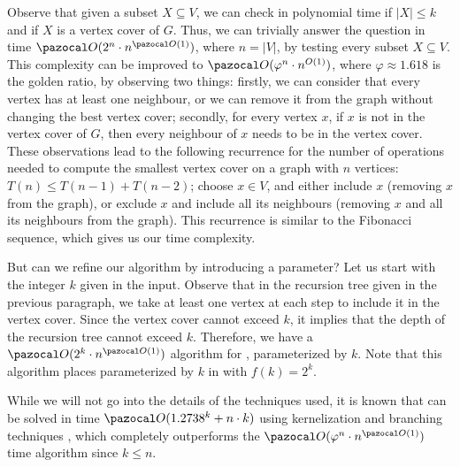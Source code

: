 Observe that given a subset $X \subseteq V$, we can check in polynomial time if $|X| \leq k$ and if $X$ is a vertex cover of $G$. Thus, we can trivially answer the question in time $\O(2^n \cdot n^{\O(1)})$, where $n = |V|$, by testing every subset $X \subseteq V$. This complexity can be improved to $\O(\varphi^n \cdot n^{O(1)})$, where $\varphi \approx 1.618$ is the golden ratio, by observing two things: firstly, we can consider that every vertex has at least one neighbour, or we can remove it from the graph without changing the best vertex cover; secondly, for every vertex $x$, if $x$ is not in the vertex cover of $G$, then every neighbour of $x$ needs to be in the vertex cover. These observations lead to the following recurrence for the number of operations needed to compute the smallest vertex cover on a graph with $n$ vertices: $T(n) \leq T(n - 1) + T(n - 2)$; choose $x \in V$, and either include $x$ (removing $x$ from the graph), or exclude $x$ and include all its neighbours (removing $x$ and all its neighbours from the graph). This recurrence is similar to the Fibonacci sequence, which gives us our time complexity.

\medskip

But can we refine our algorithm by introducing a parameter? Let us start with the integer $k$ given in the input. Observe that in the recursion tree given in the previous paragraph, we take at least one vertex at each step to include it in the vertex cover. Since the vertex cover cannot exceed $k$, it implies that the depth of the recursion tree cannot exceed $k$. Therefore, we have a $\O(2^k \cdot n^{\O(1)})$ algorithm for , parameterized by $k$. Note that this algorithm places  parameterized by $k$ in  with $f(k) = 2^k$.

While we will not go into the details of the techniques used, it is known that  can be solved in time $\O(1.2738^k + n\cdot k)$ using kernelization and branching techniques \cite{chen2006improved}, which completely outperforms the $\O(\varphi^n \cdot n^{\O(1)})$ time algorithm since $k \leq n$.

\medskip

